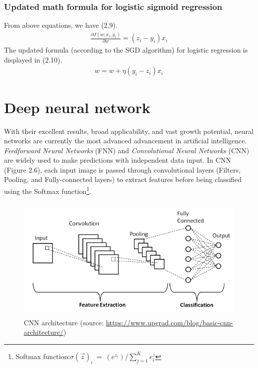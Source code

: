 \subsubsection{Updated math formula for logistic sigmoid regression}
\hspace{0.5cm}From above equations, we have (2.9).
\begin{align}
    \frac{\partial J(w; x_i, y_i)}{\partial w} = (z_i - y_i)x_i 
\end{align}
\hspace{0.5cm}The updated formula (according to the SGD algorithm) for logistic regression is displayed in (2.10).
\begin{align}
    w = w + \eta(y_i - z_i)x_i
\end{align}


\section{Deep neural network}
\label{sec:deep_neural_network}
\hspace{0.5cm}With their excellent results, broad applicability, and vast growth potential, neural networks are currently the most advanced advancement in artificial intelligence. \textit{Feedforward Neural Networks }(FNN) and \textit{Convolutional Neural Networks} (CNN) are widely used to make predictions with independent data input. In CNN (Figure 2.6), each input image is passed through convolutional layers (Filters, Pooling, and Fully-connected layers) to extract features before being classified using the Softmax function\footnote{Softmax function:$ \sigma (\overrightarrow{z})_i \: = \: (e^{z_i})/ \sum_{j=1}^{K} e^z_i  $}.
\begin{figure}[h!] 
	\centering
	\includegraphics[width=\linewidth, height=6cm,keepaspectratio]{figures/CNN.png}
	\caption{CNN architecture (source: \url{https://www.upgrad.com/blog/basic-cnn-architecture/})}
\end{figure}	

